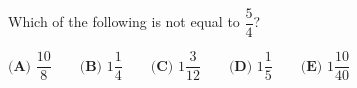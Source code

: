Which of the following is not equal to $\dfrac54$?

$\textbf{(A) }\dfrac{10}{8}\qquad\textbf{(B) }1\dfrac14\qquad\textbf{(C) }1\dfrac{3}{12}\qquad\textbf{(D) }1\dfrac15\qquad\textbf{(E) }1\dfrac{10}{40}$
